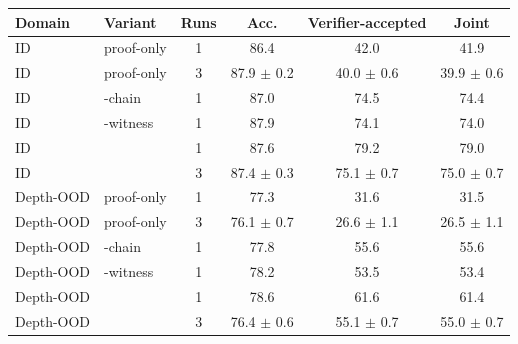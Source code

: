 \begin{tabular}{llcccc}
\toprule
Domain & Variant & Runs & Acc. & Verifier-accepted & Joint \\
\midrule
ID & proof-only & 1 & 86.4 & 42.0 & 41.9 \\
ID & proof-only & 3 & 87.9 $\pm$ 0.2 & 40.0 $\pm$ 0.6 & 39.9 $\pm$ 0.6 \\
ID & \model{}-chain & 1 & 87.0 & 74.5 & 74.4 \\
ID & \model{}-witness & 1 & 87.9 & 74.1 & 74.0 \\
ID & \model{} & 1 & 87.6 & 79.2 & 79.0 \\
ID & \model{} & 3 & 87.4 $\pm$ 0.3 & 75.1 $\pm$ 0.7 & 75.0 $\pm$ 0.7 \\
\midrule
Depth-OOD & proof-only & 1 & 77.3 & 31.6 & 31.5 \\
Depth-OOD & proof-only & 3 & 76.1 $\pm$ 0.7 & 26.6 $\pm$ 1.1 & 26.5 $\pm$ 1.1 \\
Depth-OOD & \model{}-chain & 1 & 77.8 & 55.6 & 55.6 \\
Depth-OOD & \model{}-witness & 1 & 78.2 & 53.5 & 53.4 \\
Depth-OOD & \model{} & 1 & 78.6 & 61.6 & 61.4 \\
Depth-OOD & \model{} & 3 & 76.4 $\pm$ 0.6 & 55.1 $\pm$ 0.7 & 55.0 $\pm$ 0.7 \\
\bottomrule
\end{tabular}